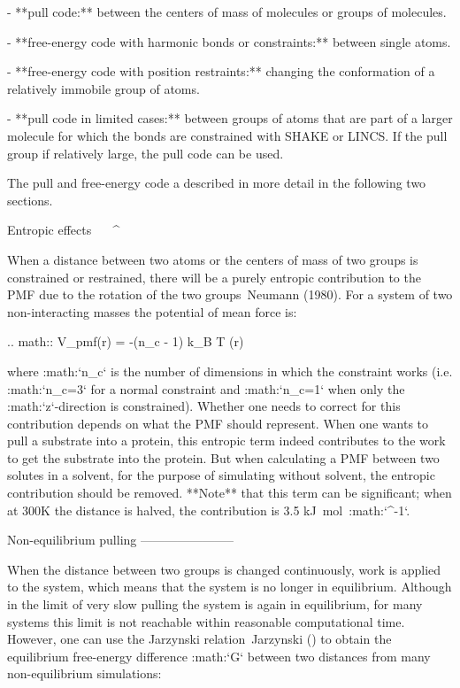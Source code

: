 -  **pull code:** between the centers of mass of molecules or groups of
   molecules.

-  **free-energy code with harmonic bonds or constraints:** between
   single atoms.

-  **free-energy code with position restraints:** changing the
   conformation of a relatively immobile group of atoms.

-  **pull code in limited cases:** between groups of atoms that are part
   of a larger molecule for which the bonds are constrained with SHAKE
   or LINCS. If the pull group if relatively large, the pull code can be
   used.

The pull and free-energy code a described in more detail in the
following two sections.

Entropic effects
^^^^^^^^^^^^^^^^

When a distance between two atoms or the centers of mass of two groups
is constrained or restrained, there will be a purely entropic
contribution to the PMF due to the rotation of the two groups Neumann
(1980). For a system of two non-interacting masses the potential of mean
force is:

.. math:: V_{pmf}(r) = -(n_c - 1) k_B T \log(r)

where :math:`n_c` is the number of dimensions in which the constraint
works (i.e. :math:`n_c=3` for a normal constraint and :math:`n_c=1` when
only the :math:`z`-direction is constrained). Whether one needs to
correct for this contribution depends on what the PMF should represent.
When one wants to pull a substrate into a protein, this entropic term
indeed contributes to the work to get the substrate into the protein.
But when calculating a PMF between two solutes in a solvent, for the
purpose of simulating without solvent, the entropic contribution should
be removed. **Note** that this term can be significant; when at 300K the
distance is halved, the contribution is 3.5 kJ mol\ :math:`^{-1}`.

Non-equilibrium pulling
-----------------------

When the distance between two groups is changed continuously, work is
applied to the system, which means that the system is no longer in
equilibrium. Although in the limit of very slow pulling the system is
again in equilibrium, for many systems this limit is not reachable
within reasonable computational time. However, one can use the Jarzynski
relation Jarzynski () to obtain the equilibrium free-energy difference
:math:`\Delta G` between two distances from many non-equilibrium
simulations:


